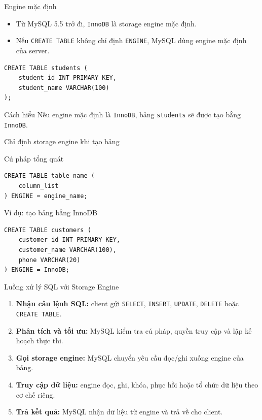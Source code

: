 \documentclass[aspectratio=169,11pt]{beamer}
\newcommand{\code}[1]{\texttt{#1}}
\newcommand{\smallitem}{\setlength{\itemsep}{2pt}}
\begin{document}
\begin{frame}[fragile]{Engine mặc định}
\begin{itemize}\smallitem
  \item Từ MySQL 5.5 trở đi, \code{InnoDB} là storage engine mặc định.
  \item Nếu \code{CREATE TABLE} không chỉ định \code{ENGINE}, MySQL dùng engine mặc định của server.
\end{itemize}
\begin{lstlisting}
CREATE TABLE students (
    student_id INT PRIMARY KEY,
    student_name VARCHAR(100)
);
\end{lstlisting}
\begin{block}{Cách hiểu}
Nếu engine mặc định là \code{InnoDB}, bảng \code{students} sẽ được tạo bằng \code{InnoDB}.
\end{block}
\end{frame}

\begin{frame}[fragile]{Chỉ định storage engine khi tạo bảng}
\begin{block}{Cú pháp tổng quát}
\begin{lstlisting}
CREATE TABLE table_name (
    column_list
) ENGINE = engine_name;
\end{lstlisting}
\end{block}
\begin{block}{Ví dụ: tạo bảng bằng InnoDB}
\begin{lstlisting}
CREATE TABLE customers (
    customer_id INT PRIMARY KEY,
    customer_name VARCHAR(100),
    phone VARCHAR(20)
) ENGINE = InnoDB;
\end{lstlisting}
\end{block}
\end{frame}

\begin{frame}{Luồng xử lý SQL với Storage Engine}
\begin{enumerate}\smallitem
  \item \textbf{Nhận câu lệnh SQL:} client gửi \code{SELECT}, \code{INSERT}, \code{UPDATE}, \code{DELETE} hoặc \code{CREATE TABLE}.
  \item \textbf{Phân tích và tối ưu:} MySQL kiểm tra cú pháp, quyền truy cập và lập kế hoạch thực thi.
  \item \textbf{Gọi storage engine:} MySQL chuyển yêu cầu đọc/ghi xuống engine của bảng.
  \item \textbf{Truy cập dữ liệu:} engine đọc, ghi, khóa, phục hồi hoặc tổ chức dữ liệu theo cơ chế riêng.
  \item \textbf{Trả kết quả:} MySQL nhận dữ liệu từ engine và trả về cho client.
\end{enumerate}
\end{frame}
\end{document}
